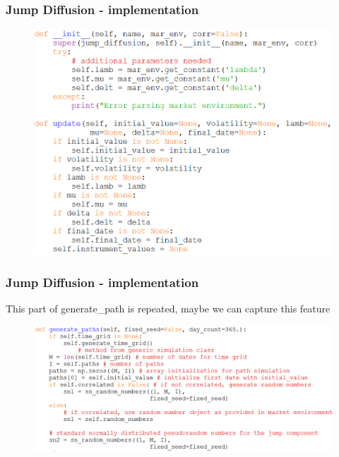 \documentclass{beamer}
\begin{document}
\begin{frame}
\frametitle{Jump Diffusion - implementation}
\begin{figure}[H]
	\includegraphics[scale=0.42]{jd_init_update.png}
\end{figure}
\end{frame}

\begin{frame}
\frametitle{Jump Diffusion - implementation}
This part of generate\_path is repeated, maybe we can capture this feature
\begin{figure}[H]
	\includegraphics[scale=0.4]{jd_generate_path_1.png}
\end{figure}
\end{frame}
\end{document}
